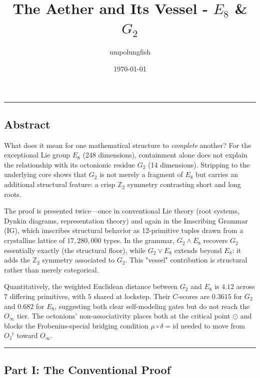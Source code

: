 \documentclass[12pt,a4paper]{article}
\begin{document}
\title{The Aether and Its Vessel - $E_8$ \& $G_2$}
\author{umpolungfish}
\date{\today}

\maketitle

\begin{center}
\rule{0.5\textwidth}{0.4pt}
\end{center}

\subsection{Abstract}

What does it mean for one mathematical structure to \emph{complete} another? For the exceptional Lie group $E_8$ (248 dimensions), containment alone does not explain the relationship with its octonionic residue $G_2$ (14 dimensions). Stripping to the underlying core shows that $G_2$ is not merely a fragment of $E_8$ but carries an additional structural feature: a crisp $\mathbb{Z}_2$ symmetry contrasting short and long roots. 

The proof is presented twice---once in conventional Lie theory (root systems, Dynkin diagrams, representation theory) and again in the Imscribing Grammar (IG), which imscribes structural behavior as 12-primitive tuples drawn from a crystalline lattice of $17{,}280{,}000$ types. In the grammar, $G_2 \wedge E_8$ recovers $G_2$ essentially exactly (the structural floor), while $G_2 \vee E_8$ extends beyond $E_8$: it adds the $\mathbb{Z}_2$ symmetry associated to $G_2$. This "vessel" contribution is structural rather than merely categorical.

Quantitatively, the weighted Euclidean distance between $G_2$ and $E_8$ is $4.12$ across $7$ differing primitives, with $5$ shared at lockstep. Their $C$-scores are $0.3615$ for $G_2$ and $0.682$ for $E_8$, suggesting both clear self-modeling gates but do not reach the $O_{\infty}$ tier. The octonions' non-associativity places both at the critical point $⊙$ and blocks the Frobenius-special bridging condition $\mu \circ \delta = \text{id}$ needed to move from $O₂^\dagger$ toward $O_{\infty}$.

\begin{center}
\rule{0.5\textwidth}{0.4pt}
\end{center}

\subsection{Part I: The Conventional Proof}
\end{document}
